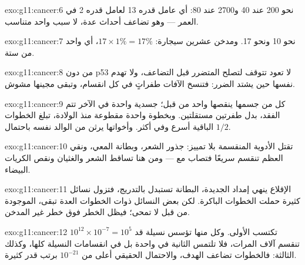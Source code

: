 \begin{solution}{exo:g11:cancer:6}
نحو 200 عند 40 و2700 عند 80: أي عامل قدره 13 لعامل قدره 2 في العمر ---
وهو تضاعف أحداث عدة، لا سبب واحد متناسب.
\end{solution}

\begin{solution}{exo:g11:cancer:7}
نحو 10 ونحو 17. ومدخن عشرين سيجارة: $17 \times 1\% = 17\%$، أي واحد
من ستة.
\end{solution}

\begin{solution}{exo:g11:cancer:8}
من دون p53 لا تعود  تتوقف لتصلح  المتضرر قبل التضاعف، ولا
تهدم نفسها حين يشتد الضرر: فتنسخ الآفات طفراتٍ في كل انقسام، وتبقى
 مجينها مشوش.
\end{solution}

\begin{solution}{exo:g11:cancer:9}
كل  من جسمها ينقصها  واحد من قبل؛  جسدية واحدة في الآخر
تتم الفقد، بدل طفرتين مستقلتين. وبخطوة واحدة مقطوعة منذ الولادة، تبلغ
الخطوات الباقية أسرع وفي  أكثر. وأخواتها يرثن  من الوالد
نفسه باحتمال $1/2$.
\end{solution}

\begin{solution}{exo:g11:cancer:10}
تقتل الأدوية  المنقسمة بلا تمييز:  جذور الشعر، وبطانة
المعي، ونقي العظم تنقسم سريعًا فتصاب مع  --- ومن هنا تساقط الشعر
والغثيان ونقص الكريات البيضاء.
\end{solution}

\begin{solution}{exo:g11:cancer:11}
الإقلاع ينهي إمداد  الجديدة،  البطانة تستبدل بالتدريج،
فتزول نسائل كثيرة حملت الخطوات الباكرة. لكن بعض النسائل ذوات الخطوات
العدة تبقى،  الموجودة من قبل لا تمحى؛ فيظل الخطر فوق خطر غير
المدخن.
\end{solution}

\begin{solution}{exo:g11:cancer:12}
$10^{12} \times 10^{-7} = 10^5$  تكتسب  الأولى. وكل منها
تؤسس نسيلة قد تنقسم آلاف المرات، فلا تلتمس  الثانية في 
واحدة بل في انقسامات النسيلة كلها، وكذلك الثالثة: فالخطوات تضاعف
الهدف، والاحتمال الحقيقي أعلى من $10^{-21}$ برتب قدر كثيرة.
\end{solution}

